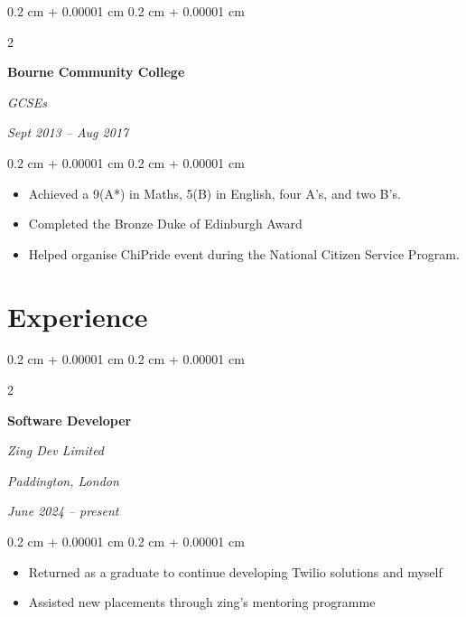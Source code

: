 \documentclass[10pt, a4paper]{article}
\newenvironment{highlights}{
    \begin{itemize}[
        topsep=0.10 cm,
        parsep=0.10 cm,
        partopsep=0pt,
        itemsep=0pt,
        leftmargin=0.4 cm + 10pt
    ]
}{
    \end{itemize}
} %
\newenvironment{onecolentry}{
    \begin{adjustwidth}{
        0.2 cm + 0.00001 cm
    }{
        0.2 cm + 0.00001 cm
    }
}{
    \end{adjustwidth}
} %
\newenvironment{twocolentry}[2][]{
    \onecolentry
    \def\secondColumn{#2}
    \setcolumnwidth{\fill, 4.5 cm}
    \begin{paracol}{2}
}{
    \switchcolumn \raggedleft \secondColumn
    \end{paracol}
    \endonecolentry
} %
\begin{document}
        \vspace{0.2 cm}

        \begin{twocolentry}{
            
            
        \textit{Sept 2013 – Aug 2017}}
            \textbf{Bourne Community College}

            \textit{GCSEs}
        \end{twocolentry}

        \vspace{0.10 cm}
        \begin{onecolentry}
            \begin{highlights}
                \item Achieved a 9(A*) in Maths, 5(B) in English, four A's, and two B's.
                \item Completed the Bronze Duke of Edinburgh Award
                \item Helped organise ChiPride event during the National Citizen Service Program.
            \end{highlights}
        \end{onecolentry}



    
    \section{Experience}



        
        \begin{twocolentry}{
        \textit{Paddington, London}    
            
        \textit{June 2024 – present}}
            \textbf{Software Developer}
            
            \textit{Zing Dev Limited}
        \end{twocolentry}

        \vspace{0.10 cm}
        \begin{onecolentry}
            \begin{highlights}
                \item Returned as a graduate to continue developing Twilio solutions and myself
                \item Assisted new placements through zing's mentoring programme
            \end{highlights}
        \end{onecolentry}
\end{document}
